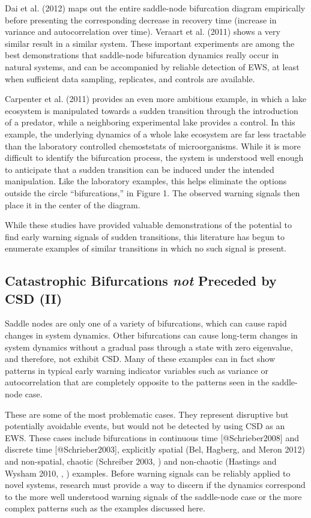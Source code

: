 \documentclass[author-year, review]{elsarticle} %
\begin{document}
Dai et al. (2012) maps out the entire saddle-node bifurcation diagram
empirically before presenting the corresponding decrease in recovery
time (increase in variance and autocorrelation over time). Veraart et
al. (2011) shows a very similar result in a similar system. These
important experiments are among the best demonstrations that saddle-node
bifurcation dynamics really occur in natural systems, and can be
accompanied by reliable detection of EWS, at least when sufficient data
sampling, replicates, and controls are available.

Carpenter et al. (2011) provides an even more ambitious example, in
which a lake ecosystem is manipulated towards a sudden transition
through the introduction of a predator, while a neighboring experimental
lake provides a control. In this example, the underlying dynamics of a
whole lake ecosystem are far less tractable than the laboratory
controlled chemoststats of microorganisms. While it is more difficult to
identify the bifurcation process, the system is understood well enough
to anticipate that a sudden transition can be induced under the intended
manipulation. Like the laboratory examples, this helps eliminate the
options outside the circle ``bifurcations,'' in Figure 1. The observed
warning signals then place it in the center of the diagram.

While these studies have provided valuable demonstrations of the
potential to find early warning signals of sudden transitions, this
literature has begun to enumerate examples of similar transitions in
which no such signal is present.

\subsection{Catastrophic Bifurcations \emph{not} Preceded by CSD (II)}

Saddle nodes are only one of a variety of bifurcations, which can cause
rapid changes in system dynamics. Other bifurcations can cause long-term
changes in system dynamics without a gradual pass through a state with
zero eigenvalue, and therefore, not exhibit CSD. Many of these examples
can in fact show patterns in typical early warning indicator variables
such as variance or autocorrelation that are completely opposite to the
patterns seen in the saddle-node case.

These are some of the most problematic cases. They represent disruptive
but potentially avoidable events, but would not be detected by using CSD
as an EWS. These cases include bifurcations in continuous time
{[}@Schrieber2008{]} and discrete time {[}@Schrieber2003{]}, explicitly
spatial (Bel, Hagberg, and Meron 2012) and non-spatial, chaotic
(Schreiber 2003, ) and non-chaotic (Hastings and Wysham 2010, , )
examples. Before warning signals can be reliably applied to novel
systems, research must provide a way to discern if the dynamics
correspond to the more well understood warning signals of the
saddle-node case or the more complex patterns such as the examples
discussed here.
\end{document}
